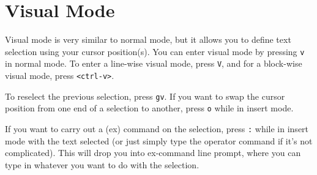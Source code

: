 \section{Visual Mode}

Visual mode is very similar to normal mode, but it allows you to define text selection using your cursor position(s).
You can enter visual mode by pressing \verb|v| in normal mode.
To enter a line-wise visual mode, press \verb|V|, and for a block-wise visual mode, press \verb|<ctrl-v>|.

To reselect the previous selection, press \verb|gv|.
If you want to swap the cursor position from one end of a selection to another, press \verb|o| while in insert mode.

If you want to carry out a (ex) command on the selection, press \verb|:| while in insert mode with the text selected (or just simply type the operator command if it's not complicated).
This will drop you into ex-command line prompt, where you can type in whatever you want to do with the selection.
